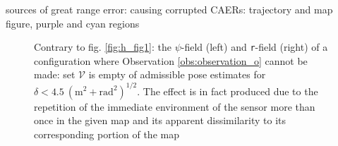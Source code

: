 sources of great range error: causing corrupted CAERs: trajectory and map figure,
purple and cyan regions


\begin{figure}
  
  \caption{\small}
  \label{fig:}
\end{figure}


\begin{figure}%
  
  \vspace{0.7cm}
  \caption{\small Contrary to fig. \ref{fig:h_fig1}: the $\psi$-field (left)
           and \texttt{r}-field (right) of a configuration where Observation
           \ref{obs:observation_o} cannot be made: set $\mathcal{V}$ is
           empty of admissible pose estimates for $\delta < 4.5 \ (\text{m}^2 + \text{rad}^2)^{1/2}$.
           The effect is in fact produced due to the repetition of the
           immediate environment of the sensor more than once in the given map
           and its apparent dissimilarity to its corresponding portion of the
           map}
  \label{fig:h_not_fig1}
\end{figure}
